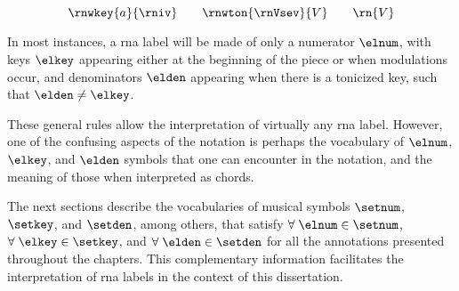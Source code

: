 \begin{equation}
    \label{eq:rn_three_annotations}
    \rnwkey{a}{\rniv} \qquad \rnwton{\rnVsev}{V} \qquad \rn{V}
\end{equation}


In most instances, a \gls{rna} label will be made of only a
numerator $\elnum$, with keys $\elkey$ appearing either at
the beginning of the piece or when modulations occur, and
denominators $\elden$ appearing when there is a tonicized
key, such that $\elden \neq \elkey$.

These general rules allow the interpretation of virtually
any \gls{rna} label. However, one of the confusing aspects
of the notation is perhaps the vocabulary of $\elnum$,
$\elkey$, and $\elden$ symbols that one can encounter in the
notation, and the meaning of those when interpreted as
chords.

The next sections describe the vocabularies of musical
symbols $\setnum$, $\setkey$, and $\setden$, among others,
that satisfy $\forall \; \elnum \in \setnum$, $\forall \;
\elkey \in \setkey$, and $\forall \; \elden \in \setden$ for
all the annotations presented throughout the chapters. This
complementary information facilitates the interpretation of
\gls{rna} labels in the context of this dissertation.

